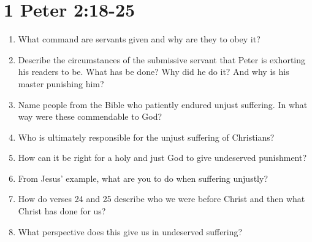 \documentclass{article}
\newcommand{\answerbox}{\vspace{1.5cm}}
\newcommand{\BE}{\begin{enumerate}}
\newcommand{\EE}{\end{enumerate}}
\newcommand{\I}{\item}
\begin{document}
\part*{1 Peter 2:18-25}

\BE
\I  What command are servants given and why are they to obey it? \answerbox
\I  Describe the circumstances of the submissive servant that Peter is exhorting
    his readers to be. What has be done? Why did he do it? And why is his master
    punishing him? \answerbox
\I  Name people from the Bible who patiently endured unjust suffering. 
    In what way were these commendable to God? \answerbox
\I  Who is ultimately responsible for the unjust suffering of Christians?
    \answerbox
\I  How can it be right for a holy and just God to give undeserved punishment?
    \answerbox
\I  From Jesus' example, what are you to do when suffering unjustly? \answerbox
\I  How do verses 24 and 25 describe who we were before Christ and then what
    Christ has done for us? \answerbox
\I  What perspective does this give us in undeserved suffering? \answerbox
\EE
\end{document}
